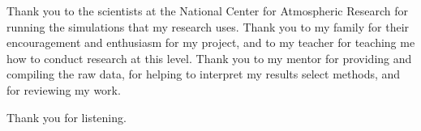 \documentclass{basic}
\begin{document}
Thank you to the scientists at the National Center for Atmospheric Research for running the simulations that my research uses. Thank you to my family for their encouragement and enthusiasm for my project, and to my teacher for teaching me how to conduct research at this level. Thank you to my mentor for providing and compiling the raw data, for helping to interpret my results select methods, and for reviewing my work.

Thank you for listening.
\end{document}
